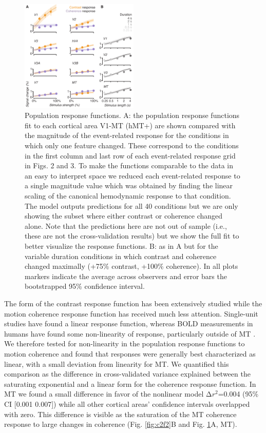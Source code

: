 \begin{figure}
\centering
\includegraphics[keepaspectratio,width=0.5\textwidth]{figs_c2/Fig5_fit.pdf}
\caption[Population response functions.]{Population response functions. A: the population response functions fit to each cortical area V1-MT (hMT+) are shown compared with the magnitude of the event-related response for the conditions in which only one feature changed. These correspond to the conditions in the first column and last row of each event-related response grid in Figs. 2 and 3. To make the functions comparable to the data in an easy to interpret space we reduced each event-related response to a single magnitude value which was obtained by finding the linear scaling of the canonical hemodynamic response to that condition. The model outputs predictions for all 40 conditions but we are only showing the subset where either contrast or coherence changed alone. Note that the predictions here are not out of sample (i.e., these are not the cross-validation results) but we show the full fit to better visualize the response functions. B: as in A but for the variable duration conditions in which contrast and coherence changed maximally (+75\% contrast, +100\% coherence). In all plots markers indicate the average across observers and error bars the bootstrapped 95\% confidence interval.}
\label{fig:c2f5}
\end{figure}


The form of the contrast response function has been extensively studied \citep{Albrecht1982-rq,Boynton1999-jd,Sclar1990-lk} while the motion coherence response function has received much less attention. Single-unit studies have found a linear response function, whereas BOLD measurements in humans have found some non-linearity of response, particularly outside of MT \citep{Rees2000-ul}. We therefore tested for non-linearity in the population response functions to motion coherence and found that responses were generally best characterized as linear, with a small deviation from linearity for MT. We quantified this comparison as the difference in cross-validated variance explained between the saturating exponential and a linear form for the coherence response function. In MT we found a small difference in favor of the nonlinear model Δ$r^2$=0.004 (95\% CI [0.001 0.007]) while all other cortical areas’ confidence intervals overlapped with zero. This difference is visible as the saturation of the MT coherence response to large changes in coherence (Fig. \ref{fig:c2f2}B and Fig. \ref{fig:c2f5}A, MT).

